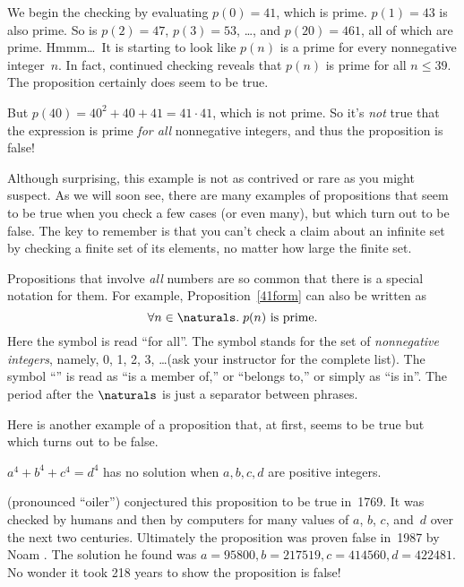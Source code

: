 We begin the checking by evaluating $p(0) = 41$, which is prime.
$p(1) = 43$ is also prime.  So is $p(2) = 47$, $p(3)=53$, \dots, and
$p(20) = 461$, all of which are prime.  Hmmm\dots\ It is starting to
look like $p(n)$ is a prime for every nonnegative integer~$n$.  In
fact, continued checking reveals that $p(n)$ is prime for all $n \le
39$.
The proposition certainly does seem to be true.

But $p(40) = 40^2 + 40 + 41 = 41 \cdot 41$, which is not prime.  So
it's \emph{not} true that the expression is prime \emph{for all}
nonnegative integers, and thus the proposition is false!

Although surprising, this example is not as contrived or rare as you
might suspect.  As we will soon see, there are many examples of
propositions that seem to be true when you check a few cases (or even
many), but
which turn out to be false.  The key to remember is that you
can't check a claim about an infinite
set by checking a finite set of its elements, no matter how large the
finite set.

Propositions that involve \emph{all} numbers
are so common that there is a special notation for them.  For example,
Proposition~\ref{41form} can also be written as
\begin{equation}\label{pn}
\forall n \in \naturals.\; p(n) \text{ is prime}.
\end{equation}
Here the symbol \term{$\forall$} is read ``for all''.  The symbol
\term{$\naturals$} stands for the set of {\em nonnegative integers},
namely, 0, 1, 2, 3, \dots (ask your instructor for the complete list).
The symbol ``\term{$\in$}'' is read as ``is a member of,'' or
``belongs to,'' or simply as ``is in''.  The period after the
$\naturals$ is just a separator between phrases.

\iffalse
\begin{notesproblem}
Show that no nonconstant polynomial can map all nonnegative integers into
prime numbers.  (This can be proved using elementary algebra, but it's a
little tricky.  It will be easier to show after we study modular
arithmetic later in the term.)
\end{notesproblem}
\fi

Here is another example of a proposition that, at first, seems to be
true but which turns out to be false.
\begin{proposition}\label{a4}
$a^4 + b^4 + c^4 = d^4$ has no solution when $a, b, c, d$ are positive
integers.
\end{proposition}
 (pronounced ``oiler'') conjectured this proposition to be
true in~1769.  It was checked by humans and then by computers for many
values of $a$, $b$, $c$, and~$d$ over the next two centuries.
Ultimately the proposition was proven false in~1987 by Noam
.  The solution he found was $a = 95800, b = 217519, c =
414560, d = 422481$.  No wonder it took 218 years to show the
proposition is false!

